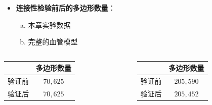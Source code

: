 \begin{frame}
\begin{itemize}
  \item \textbf{连接性检验前后的多边形数量}：
  \begin{enumerate}[(a)]
    \item 本章实验数据
    \item 完整的血管模型
  \end{enumerate}
\end{itemize}
\begin{table}[!ht]
\renewcommand{\arraystretch}{0.5}
\centering
\begin{columns}[b,onlytextwidth]
\begin{column}{.5\textwidth}
\begin{tabular*}{40mm}{lc}
\toprule
~                                & \small{多边形数量} \\
\midrule
\small{验证前}                   & \small{$70,625$}  \\
\midrule
\small{验证后}                   & \small{$70,625$}  \\
\bottomrule
\end{tabular*}
\end{column}
\begin{column}{.5\textwidth}
\begin{tabular*}{40mm}{lc}
\toprule
~                                & \small{多边形数量} \\
\midrule
\small{验证前}                   & \small{$205,590$}  \\
\midrule
\small{验证后}                   & \small{$205,452$}  \\
\bottomrule
\end{tabular*}
\end{column}
\end{columns}
\end{table}
\end{frame}

